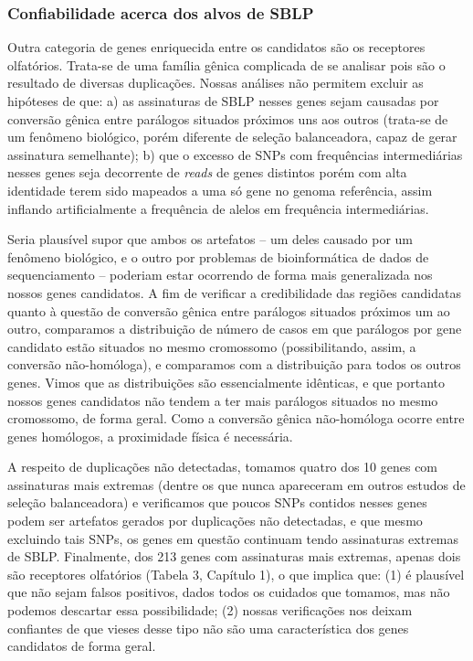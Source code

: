 \begin{refsection}
\subsubsection{Confiabilidade acerca dos alvos de SBLP}%

Outra categoria de genes enriquecida entre os candidatos são os receptores olfatórios. Trata-se de uma família gênica complicada de se analisar pois 
são o resultado de diversas duplicações. Nossas análises não permitem excluir as hipóteses de que: a) as assinaturas de SBLP nesses genes sejam causadas por
conversão gênica entre parálogos situados próximos uns aos outros (trata-se de um fenômeno biológico, porém diferente de seleção balanceadora, capaz de gerar assinatura semelhante); b) que o excesso de SNPs com frequências intermediárias nesses genes seja decorrente de \emph{reads} de genes distintos porém com alta identidade terem sido mapeados a uma só gene no genoma referência, assim inflando artificialmente a frequência de alelos em frequência intermediárias. 

Seria plausível supor que ambos os artefatos -- um deles causado por um fenômeno biológico, e o outro por problemas de bioinformática de dados de sequenciamento -- poderiam estar ocorrendo de forma mais generalizada nos nossos genes candidatos. A fim de verificar a credibilidade das regiões candidatas quanto à questão de conversão gênica entre parálogos situados próximos um ao outro, comparamos a distribuição de número de casos em que parálogos por gene candidato estão situados no mesmo cromossomo (possibilitando, assim, a conversão não-homóloga), e comparamos com a distribuição para todos os outros genes. Vimos que as distribuições são essencialmente idênticas, e que portanto nossos genes candidatos não tendem a ter mais parálogos situados no mesmo cromossomo, de forma geral. Como a conversão gênica não-homóloga ocorre entre genes homólogos, a proximidade física é necessária. 


A respeito de duplicações não detectadas, tomamos quatro dos 10 genes com assinaturas mais extremas (dentre os que nunca apareceram em outros estudos de seleção balanceadora) e verificamos que poucos SNPs contidos nesses genes podem ser artefatos gerados por duplicações não detectadas, e que mesmo excluindo tais SNPs, os genes em questão continuam tendo assinaturas extremas de SBLP. Finalmente, dos 213 genes com assinaturas mais extremas, apenas dois são receptores olfatórios (Tabela 3, Capítulo 1), o que implica que: (1) é plausível que não sejam falsos positivos, dados todos os cuidados que tomamos, mas não podemos descartar essa possibilidade; (2) nossas verificações nos deixam confiantes de que vieses desse tipo não são uma característica dos genes candidatos de forma geral.




\end{refsection}
